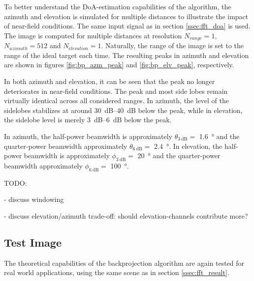 To better understand the DoA-estimation capabilities of the algorithm,
the azimuth and elevation is simulated for multiple distances to illustrate the impact of near-field conditions.
The same input signal as in section \ref{ssec:fft_doa} is used.
\\

The image is computed for multiple distances at resolution
$N_{range} = 1$, ${N_{azimuth} = 512}$ and $N_{elevation} = 1$.
Naturally, the range of the image is set to the range of the ideal target each time.
The resulting peaks in azimuth and elevation are shown in figures \ref{fig:bp_azm_peak} and \ref{fig:bp_elv_peak}, respectively.


In both azimuth and elevation, it can be seen that the peak no longer deteriorates in near-field conditions.
The peak and most side lobes remain virtually identical across all considered ranges.
In azimuth, the level of the sidelobes stabilizes at around \SIrange{30}{40}{\dB} below the peak,
while in elevation, the sidelobe level is merely \SIrange{3}{6}{\dB} below the peak.

In azimuth, the half-power beamwidth is approximately $\theta_{\SI{3}{\dB}}=$ \SI{1.6}{\degree} and
the quarter-power beamwidth approximately $\theta_{\SI{6}{\dB}}=$ \SI{2.4}{\degree}.
In elevation, the half-power beamwidth is approximately $\phi_{\SI{3}{\dB}}=$ \SI{20}{\degree} and
the quarter-power beamwidth approximately $\phi_{\SI{6}{\dB}}=$ \SI{100}{\degree}.

TODO:

- discuss windowing

- discuss elevation/azimuth trade-off: should elevation-channels contribute more?


\newpage
\subsection{Test Image}
The theoretical capabilities of the backprojection algorithm are again tested for real world applications,
using the same scene as in section \ref{ssec:fft_result}.

